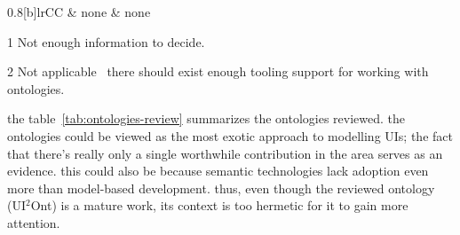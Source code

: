 \begin{table}[]
\begin{threeparttable}[b]
\begin{tabularx}{0.8\textwidth}[b]{lrCC}
                        & none                                                    & none                                               \\
                \bottomrule
            \end{tabularx}
            \begin{tablenotes}
                \item [1] Not enough information to decide.
                \item [2] Not applicable \textemdash\ there should exist enough tooling support for working with ontologies.
            \end{tablenotes}
        \end{threeparttable}
\end{table}

the table~\ref{tab:ontologies-review} summarizes the ontologies reviewed.
the ontologies could be viewed as the most exotic approach to modelling UIs;
the fact that there's really only a single worthwhile contribution in the area serves as an evidence.
this could also be because semantic technologies lack adoption even more than model-based development.
thus, even though the reviewed ontology (UI$^{2}$Ont) is a mature work, its context is too hermetic for it to gain more attention.
